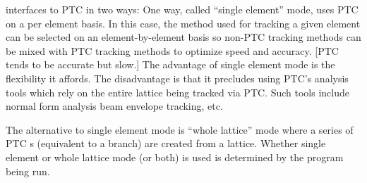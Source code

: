 \bmad interfaces to PTC in two ways: One way, called ``single
element'' mode, uses PTC on a per element basis. In this case, the
method used for tracking a given element can be selected on an
element-by-element basis so non-PTC tracking methods can be mixed with
PTC tracking methods to optimize speed and accuracy. [PTC tends to be
accurate but slow.] The advantage of single element mode is the
flexibility it affords. The disadvantage is that it precludes using
PTC's analysis tools which rely on the entire lattice being tracked
via PTC. Such tools include normal form analysis beam envelope
tracking, etc.

The alternative to single element mode is ``whole lattice'' mode where
a series of PTC s (equivalent to a \bmad branch) are
created from a \bmad lattice. Whether single element or whole lattice
mode (or both) is used is determined by the program being run.

